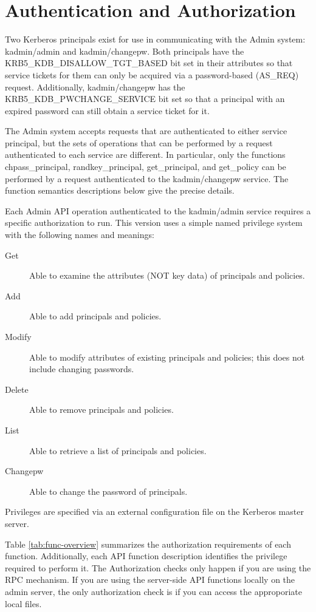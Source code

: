\section{Authentication and Authorization}
\label{sec:auth}

Two Kerberos principals exist for use in communicating with the Admin
system: kadmin/admin and kadmin/changepw.  Both principals
have the KRB5_KDB_DISALLOW_TGT_BASED bit set in their attributes so
that service tickets for them can only be acquired via a
password-based (AS_REQ) request.  Additionally, kadmin/changepw
has the KRB5_KDB_PWCHANGE_SERVICE bit set so that a principal with an
expired password can still obtain a service ticket for it.

The Admin system accepts requests that are authenticated to either
service principal, but the sets of operations that can be performed by
a request authenticated to each service are different.  In particular,
only the functions chpass_principal, randkey_principal, get_principal,
and get_policy can be performed by a request authenticated to the
kadmin/changepw service.  The function semantics descriptions below
give the precise details.

Each Admin API operation authenticated to the kadmin/admin service
requires a specific authorization to run.  This version uses a simple
named privilege system with the following names and meanings:

\begin{description}
\item[Get] Able to examine the attributes (NOT key data) of principals
and policies. 
\item[Add] Able to add principals and policies.
\item[Modify] Able to modify attributes of existing principals and
policies; this does not include changing passwords.
\item[Delete] Able to remove principals and policies.
\item[List] Able to retrieve a list of principals and policies.
\item[Changepw] Able to change the password of principals.
\end{description}

Privileges are specified via an external configuration file on the
Kerberos master server.

Table \ref{tab:func-overview} summarizes the authorization
requirements of each function.  Additionally, each API function
description identifies the privilege required to perform it.  The
Authorization checks only happen if you are using the RPC mechanism.
If you are using the server-side API functions locally on the admin
server, the only authorization check is if you can access the
approporiate local files.

